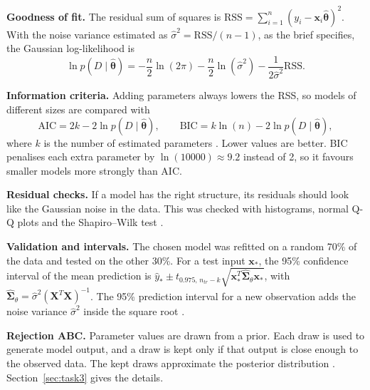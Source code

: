 \textbf{Goodness of fit.} The residual sum of squares is $\text{RSS}=\sum_{i=1}^{n}(y_i-\mathbf{x}_i\hat{\boldsymbol{\theta}})^2$. With the noise variance estimated as $\hat\sigma^2=\text{RSS}/(n-1)$, as the brief specifies, the Gaussian log-likelihood is
\begin{equation}
\ln p(D\mid\hat{\boldsymbol{\theta}})=-\frac{n}{2}\ln(2\pi)-\frac{n}{2}\ln(\hat\sigma^2)-\frac{1}{2\hat\sigma^2}\text{RSS}.
\label{eq:loglik}
\end{equation}

\textbf{Information criteria.} Adding parameters always lowers the RSS, so models of different sizes are compared with
\begin{equation}
\text{AIC}=2k-2\ln p(D\mid\hat{\boldsymbol{\theta}}),\qquad
\text{BIC}=k\ln(n)-2\ln p(D\mid\hat{\boldsymbol{\theta}}),
\label{eq:aicbic}
\end{equation}
where $k$ is the number of estimated parameters \citep{akaike1974,schwarz1978}. Lower values are better. BIC penalises each extra parameter by $\ln(10000)\approx9.2$ instead of 2, so it favours smaller models more strongly than AIC.

\textbf{Residual checks.} If a model has the right structure, its residuals should look like the Gaussian noise in the data. This was checked with histograms, normal Q-Q plots and the Shapiro--Wilk test \citep{shapiro1965}.

\textbf{Validation and intervals.} The chosen model was refitted on a random 70\% of the data and tested on the other 30\%. For a test input $\mathbf{x}_*$, the 95\% confidence interval of the mean prediction is $\hat y_*\pm t_{0.975,\,n_{tr}-k}\sqrt{\mathbf{x}_*^T\hat{\boldsymbol\Sigma}_\theta\mathbf{x}_*}$, with $\hat{\boldsymbol\Sigma}_\theta=\hat\sigma^2(\mathbf{X}^T\mathbf{X})^{-1}$. The 95\% prediction interval for a new observation adds the noise variance $\hat\sigma^2$ inside the square root \citep{james2013}.

\textbf{Rejection ABC.} Parameter values are drawn from a prior. Each draw is used to generate model output, and a draw is kept only if that output is close enough to the observed data. The kept draws approximate the posterior distribution \citep{pritchard1999,beaumont2002,sunnaker2013}. Section~\ref{sec:task3} gives the details.
